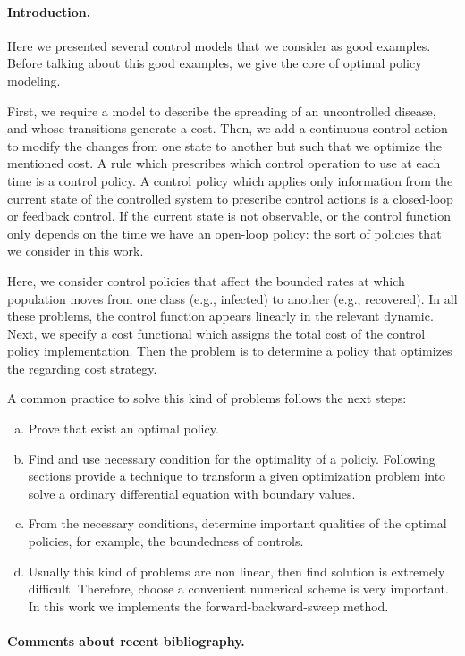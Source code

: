 
\paragraph{Introduction.} 
Here we presented several control models that we consider as good 
examples. Before talking about this good examples, we give the core of optimal 
policy modeling.

First, we require a model to describe the spreading of an uncontrolled disease,
and whose transitions generate a cost. Then, we add a continuous control action
to modify the changes from one state to another but such that we optimize the
mentioned cost. A rule which prescribes which control operation to use at each
time is a control policy. A control policy which applies only information from
the current state of the controlled system to prescribe control actions is a
closed-loop or feedback control. If the current state is not observable, or the
control function only depends on the time we have an open-loop policy: the sort
of policies that we consider in this work.

  Here, we consider control policies that affect the bounded rates at which
population moves from one class (e.g., infected) to another (e.g., recovered).
In all these problems, the control function appears linearly in the relevant
dynamic. Next, we specify a cost functional which assigns the total cost of the
control policy implementation. Then the problem is to determine a policy that
optimizes the regarding cost strategy.

  A common practice to solve this kind of problems follows the next steps:
  \begin{enumerate}[(a)]
    \item
      Prove that exist an optimal policy.
    \item 
      Find and use necessary condition for the optimality of a policiy.
      Following sections provide a technique to transform a given optimization
      problem into solve a ordinary differential equation with boundary values.
    \item 
      From the necessary conditions, determine important qualities of the 
      optimal policies, for example, the boundedness of controls.
    \item 
      Usually this kind of problems are non linear, then find solution is 
      extremely difficult. Therefore, choose a convenient numerical scheme is
      very important. In this work we implements the forward-backward-sweep 
      method.
  \end{enumerate}
\paragraph{Comments about recent bibliography.}
